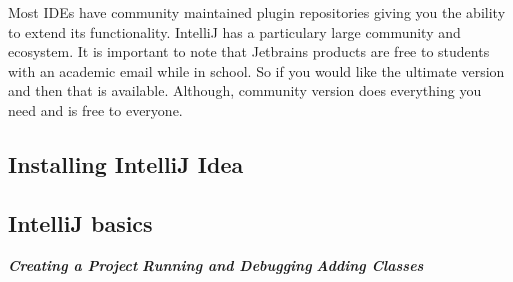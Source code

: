 \documentclass[../../main.tex]{subfiles}
\begin{document}
Most IDEs have community maintained plugin repositories giving you the ability to extend its functionality.
IntelliJ has a particulary large community and ecosystem. It is important to note that Jetbrains products
are free to students with an academic email while in school. So if you would like the ultimate version and
then that is available. Although, community version does everything you need and is free to everyone.

\pagebreak

\subsection{Installing IntelliJ Idea}
\subsection{IntelliJ basics}
\emph{\bfseries Creating a Project}
\emph{\bfseries Running and Debugging}
\emph{\bfseries Adding Classes}
\end{document}
